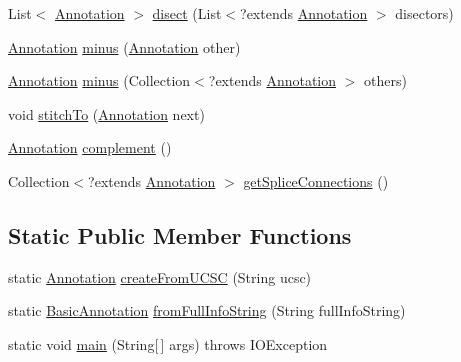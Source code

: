 \begin{DoxyCompactItemize}
\item 
List$<$ \hyperlink{interfaceumms_1_1core_1_1annotation_1_1_annotation}{Annotation} $>$ \hyperlink{classumms_1_1core_1_1annotation_1_1_basic_annotation_a08d97bbef24404d5d61ab735a717e0fd}{disect} (List$<$?extends \hyperlink{interfaceumms_1_1core_1_1annotation_1_1_annotation}{Annotation} $>$ disectors)
\item 
\hyperlink{interfaceumms_1_1core_1_1annotation_1_1_annotation}{Annotation} \hyperlink{classumms_1_1core_1_1annotation_1_1_basic_annotation_a065db388244cee9269d0ee03a7c76f42}{minus} (\hyperlink{interfaceumms_1_1core_1_1annotation_1_1_annotation}{Annotation} other)
\item 
\hyperlink{interfaceumms_1_1core_1_1annotation_1_1_annotation}{Annotation} \hyperlink{classumms_1_1core_1_1annotation_1_1_basic_annotation_a73b11db561f2ff7d438967242678c8c9}{minus} (Collection$<$?extends \hyperlink{interfaceumms_1_1core_1_1annotation_1_1_annotation}{Annotation} $>$ others)
\item 
void \hyperlink{classumms_1_1core_1_1annotation_1_1_basic_annotation_a049964537bfd15dcb46d488f2f14b2f1}{stitch\+To} (\hyperlink{interfaceumms_1_1core_1_1annotation_1_1_annotation}{Annotation} next)
\item 
\hyperlink{interfaceumms_1_1core_1_1annotation_1_1_annotation}{Annotation} \hyperlink{classumms_1_1core_1_1annotation_1_1_basic_annotation_a4e365680579c67297f191e9fcd804b02}{complement} ()
\item 
Collection$<$?extends \hyperlink{interfaceumms_1_1core_1_1annotation_1_1_annotation}{Annotation} $>$ \hyperlink{classumms_1_1core_1_1annotation_1_1_basic_annotation_a8de58e046b212813b450d383e0f6c8e2}{get\+Splice\+Connections} ()
\end{DoxyCompactItemize}
\subsection*{Static Public Member Functions}
\begin{DoxyCompactItemize}
\item 
static \hyperlink{interfaceumms_1_1core_1_1annotation_1_1_annotation}{Annotation} \hyperlink{classumms_1_1core_1_1annotation_1_1_basic_annotation_a29f98089d7537358134502ac8f3edf79}{create\+From\+U\+C\+S\+C} (String ucsc)
\item 
static \hyperlink{classumms_1_1core_1_1annotation_1_1_basic_annotation}{Basic\+Annotation} \hyperlink{classumms_1_1core_1_1annotation_1_1_basic_annotation_aa4cae4c9d14dce2f873fc9a663cc199e}{from\+Full\+Info\+String} (String full\+Info\+String)
\item 
static void \hyperlink{classumms_1_1core_1_1annotation_1_1_basic_annotation_a3d87cb62eec12f2643e3da6910e460a9}{main} (String\mbox{[}$\,$\mbox{]} args)  throws I\+O\+Exception
\end{DoxyCompactItemize}

